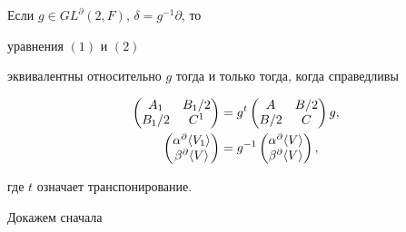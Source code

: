 \begin{thm} Если $g\in GL^\partial(2,F)$, $\delta=g^{-1}\partial$, то 


уравнения $(1)$ и $(2)$ 


эквивалентны относительно $g$ тогда и только тогда, когда справедливы 


\begin{equation} 


\begin{split} 


\begin{pmatrix} 


A_1 & B_1/2 \\ B_1/2 & C^1 


\end{pmatrix} 


&=g^t 


\begin{pmatrix} 


A & B/2 \\ B/2 & C 


\end{pmatrix} 


g,\\ 


\begin{pmatrix} 


\alpha^\partial\la V_1 \ra \\ \beta^\partial\la V \ra 


\end{pmatrix} 


&=g^{-1} 


\begin{pmatrix} 


\alpha^\partial\la V \ra \\ \beta^\partial\la V \ra 


\end{pmatrix} 


, 


\end{split} 


\end{equation} 


где $t$ означает транспонирование. 


\end{thm} 


 


Докажем сначала 


 


